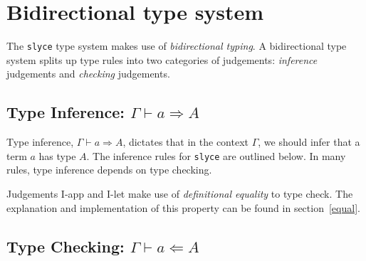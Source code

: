 \section{Bidirectional type system}
The \texttt{slyce} type system makes use of \emph{bidirectional typing}. 
A bidirectional type system splits up type rules into two categories of judgements: \emph{inference} judgements and \emph{checking} judgements.
\subsection{Type Inference: $\Gamma\vdash a \Rightarrow A$}
Type inference, $\Gamma\vdash a \Rightarrow A$\footnotemark, dictates that in the context $\Gamma$, we should infer that a term $a$ has type $A$.
The inference rules for \texttt{slyce} are outlined below.
In many rules, type inference depends on type checking.



Judgements I-app and I-let make use of \emph{definitional equality} to type check. The explanation and implementation of this property can be found in section~\ref{equal}.

\subsection{Type Checking: $\Gamma\vdash a \Leftarrow A$}




